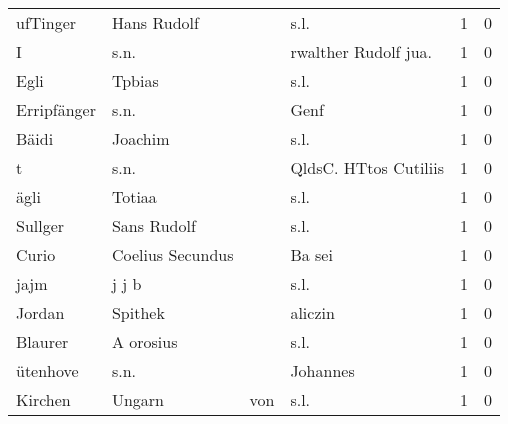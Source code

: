 \begin{tabular}{llllrr}
                 ufTinger &                        Hans Rudolf &             &                                        s.l. &          1 &         0 \\
                        I &                               s.n. &             &                       rwalther Rudolf jua.  &          1 &         0 \\
                     Egli &                             Tpbias &             &                                        s.l. &          1 &         0 \\
              Erripfänger &                               s.n. &             &                                        Genf &          1 &         0 \\
                    Bäidi &                            Joachim &             &                                        s.l. &          1 &         0 \\
                        t &                               s.n. &             &                       QldsC. HTtos Cutiliis &          1 &         0 \\
                     ägli &                             Totiaa &             &                                        s.l. &          1 &         0 \\
                  Sullger &                        Sans Rudolf &             &                                        s.l. &          1 &         0 \\
                    Curio &                   Coelius Secundus &             &                                      Ba sei &          1 &         0 \\
                     jajm &                              j j b &             &                                        s.l. &          1 &         0 \\
                   Jordan &                            Spithek &             &                                     aliczin &          1 &         0 \\
                  Blaurer &                          A orosius &             &                                        s.l. &          1 &         0 \\
                 ütenhove &                               s.n. &             &                                    Johannes &          1 &         0 \\
                  Kirchen &                             Ungarn &         von &                                        s.l. &          1 &         0 \\

\end{tabular}
